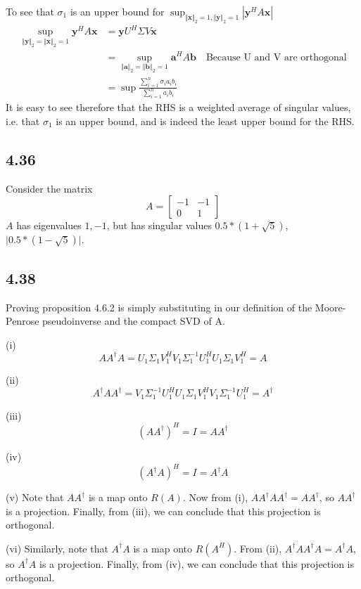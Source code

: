 \documentclass{article}
\begin{document}
	To see that $\sigma_1$ is an upper bound for $\sup_{\Vert \mathbf{x} \Vert_2 = 1, \Vert \mathbf{y} \Vert_2 = 1} |\mathbf{y}^H A \mathbf{x}|$
	\begin{align*}
	\sup_{\Vert \mathbf{y} \Vert_2 = \Vert \mathbf{x} \Vert_2 = 1} \mathbf{y}^H A \mathbf{x} &= \mathbf{y} U^H \Sigma V \mathbf{x} \\
	&= \sup_{\Vert \mathbf{a} \Vert_2 = \Vert \mathbf{b} \Vert_2 = 1} \mathbf{a}^H A \mathbf{b} \quad \text{Because U and V are orthogonal} \\
	&= \sup \frac{\sum_{i=1}^{n}\sigma_i  a_i b_i }{\sum_{i=1}^{n} a_i b_i}
	\end{align*}
	It is easy to see therefore that the RHS is a weighted average of singular values, i.e. that $\sigma_1$ is an upper bound, and is indeed the least upper bound for the RHS.
	
	\subsection*{4.36}
	Consider the matrix
	\[ A = \begin{bmatrix} -1 & -1 \\ 0 & 1 \end{bmatrix}\]
	$A$ has eigenvalues $1, -1$, but has singular values $0.5*(1 + \sqrt{5})$, $\vert 0.5*(1 - \sqrt{5}) \vert$. 
	
	\subsection*{4.38}
	Proving proposition 4.6.2 is simply substituting in our definition of the Moore-Penrose pseudoinverse and the compact SVD of A.
	
	(i) 
	\[ A A^{\dagger} A = U_1 \Sigma_1 V_1^H V_1 \Sigma_1^{-1} U_1^H U_1 \Sigma_1 V_1^H = A \]
	
	(ii)
	\[ A^{\dagger} A A^{\dagger} = V_1 \Sigma_1^{-1} U_1^H U_1 \Sigma_1 V_1^H V_1 \Sigma_1^{-1} U_1^H = A^{\dagger} \]
	
	(iii)
	\[ (A A^{\dagger})^H = I = A A^{\dagger} \]
	
	(iv)
	\[ (A^{\dagger} A)^H = I = A^{\dagger} A \]
	
	(v)
	Note that $A A^{\dagger}$ is a map onto $R(A)$. Now from (i), $A A^{\dagger} A A^{\dagger} = A A^{\dagger}$, so $A A^{\dagger}$ is a projection. Finally, from (iii), we can conclude that this projection is orthogonal.
	
	(vi)
	Similarly, note that $A^{\dagger} A$ is a map onto $R(A^H)$. From (ii), $A^{\dagger} A A^{\dagger} A = A^{\dagger} A$, so $A^{\dagger} A$ is a projection. Finally, from (iv), we can conclude that this projection is orthogonal.
	
\end{document}
